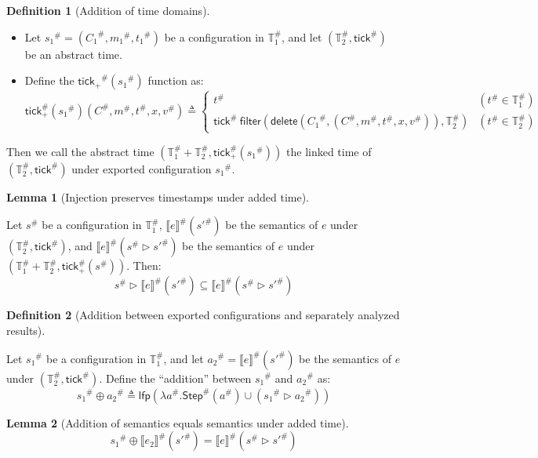 \documentclass[acmsmall,screen,review]{acmart}
\theoremstyle{definition}
\newtheorem{definition}{Definition}[section]
\newtheorem{lem}{Lemma}[section]
\newcommand*{\A}[1]{{#1}^{\#}}
\newcommand*{\Time}{\mathbb{T}}
\newcommand*{\ATime}{\A{\Time}}
\newcommand*{\mem}{m}
\newcommand*{\sembracket}[1]{\lBrack{#1}\rBrack}
\newcommand*{\tick}{\mathsf{tick}}
\newcommand*{\delete}{\mathsf{delete}}
\newcommand*{\filter}{\mathsf{filter}}
\begin{document}
\begin{definition}[Addition of time domains]
  $\:$

  \begin{itemize}
    \item Let $\A{s_1}=(\A{C_1},\A{\mem_1},\A{t_1})$ be a configuration in $\ATime_1$, and let $(\ATime_2,\A{\tick})$ be an abstract time.
    \item Define the $\A{\tick_{+}}(\A{s_1})$ function as:
          \[
            \A\tick_{+}(\A{s_1})(\A{C},\A\mem,\A{t},x,\A{v})\triangleq
            \begin{cases}
              \A{t}                                                                      & (\A{t}\in\ATime_1) \\
              \A{\tick}\:\filter(\delete(\A{C_1},(\A{C},\A\mem,\A{t},x,\A{v})),\ATime_2) & (\A{t}\in\ATime_2)
            \end{cases}
          \]
  \end{itemize}

  Then we call the abstract time $(\ATime_1+\ATime_2,\A\tick_{+}(\A{s_1}))$ the linked time of $(\ATime_2,\A{\tick})$ under exported configuration $\A{s_1}$.
\end{definition}

\begin{lem}[Injection preserves timestamps under added time]
  $\:$

  Let $\A{s}$ be a configuration in $\ATime_1$, $\A{\sembracket{e}}(\A{s'})$ be the semantics of $e$ under $(\ATime_2,\A\tick)$, and $\A{\sembracket{e}}(\A{s}\rhd\A{s'})$ be the semantics of $e$ under $(\ATime_1+\ATime_2,\A\tick_{+}(\A{s}))$.
  Then:
  \[
    \A{s}\rhd\A{\sembracket{e}}(\A{s'})\subseteq\A{\sembracket{e}}(\A{s}\rhd\A{s'})
  \]
\end{lem}

\begin{definition}[Addition between exported configurations and separately analyzed results]
  $\:$

  Let $\A{s_1}$ be a configuration in $\ATime_1$, and let $\A{a_2}=\A{\sembracket{e}}(\A{s'})$ be the semantics of $e$ under $(\ATime_2,\A\tick)$.
  Define the ``addition'' between $\A{s_1}$ and $\A{a_2}$ as:
  \[
    \A{s_1}\oplus\A{a_2}\triangleq\mathsf{lfp}(\lambda\A{a}.\A{\mathsf{Step}}(\A{a})\cup(\A{s_1}\rhd\A{a_2}))
  \]
\end{definition}

\begin{lem}[Addition of semantics equals semantics under added time]
  \[
    \A{s_1}\oplus\A{\sembracket{e_2}}(\A{s'}) = \A{\sembracket{e}}(\A{s}\rhd\A{s'})
  \]
\end{lem}
\end{document}

